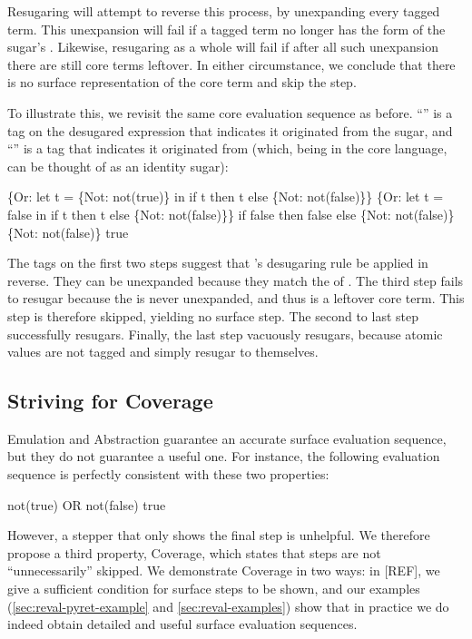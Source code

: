 Resugaring will attempt to reverse this process, by unexpanding every
tagged term. This unexpansion will fail if a tagged term no longer has
the form of the sugar's . Likewise, resugaring as a whole will
fail if after all such unexpansion there are still core terms
leftover. In either circumstance, we conclude that there is no
surface representation of the core term and skip the step.

To illustrate this, we revisit the same core evaluation sequence as
before. ``'' is a tag on the desugared expression that
indicates it originated from the  sugar, and ``''
is a tag that indicates it originated from  (which, being in
the core language, can be thought of as an identity sugar):
\begin{Codes}
    \{Or: let t = \{Not: not(true)\} in
      if t then t else \{Not: not(false)\}\}
\CoreStep \{Or: let t = false in
      if t then t else \{Not: not(false)\}\}
\CoreStep if false then false else \{Not: not(false)\}
\CoreStep \{Not: not(false)\}
\CoreStep true
\end{Codes}
The tags on the first two steps suggest that 's
desugaring rule be applied in reverse. They can be unexpanded
because they match the  of . The third step fails to
resugar because the  is never unexpanded, and thus is a
leftover core term. This step is therefore skipped, yielding no
surface step. The second to last step successfully resugars. Finally,
the last step vacuously resugars, because atomic values are not tagged
and simply resugar to themselves.

\subsection{Striving for Coverage}

Emulation and Abstraction guarantee an accurate
surface evaluation sequence, but they do not guarantee a useful one. For
instance, the following evaluation sequence is perfectly consistent with
these two properties:
\begin{Codes}
    not(true) OR not(false)
\SurfStep true
\end{Codes}
However, a stepper that only shows the final step is unhelpful. We therefore
propose a third property, Coverage, which states that steps
are not ``unnecessarily'' skipped. We demonstrate Coverage in two
ways: in [REF], we give a sufficient condition for surface steps to be
shown, and our examples (\cref{sec:reval-pyret-example} and
\cref{sec:reval-examples}) show that in practice we do indeed obtain
detailed and useful surface evaluation sequences.

